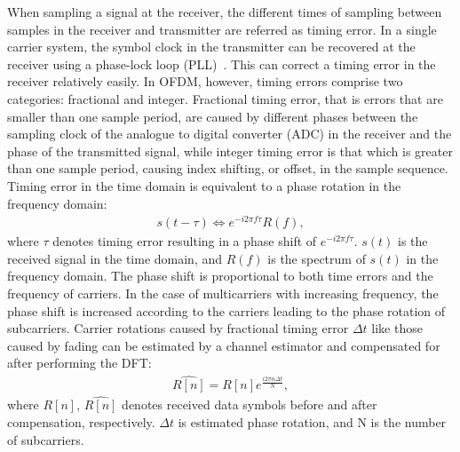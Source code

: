 When sampling a signal at the receiver, the different times of sampling between samples in the receiver and transmitter are referred as timing error.
In a single carrier system, the symbol clock in the transmitter can be recovered at the receiver using a phase-lock loop (PLL)~\cite{farhang2008signal}.
This can correct a timing error in the receiver relatively easily.
In OFDM, however, timing errors comprise two categories: fractional and integer.
Fractional timing error, that is errors that are smaller than one sample period, are caused by different phases between the sampling clock of the analogue to digital converter (ADC) in the receiver and the phase of the transmitted signal, while integer timing error is that which is greater than one sample period, causing index shifting, or offset, in the sample sequence.
Timing error in the time domain is equivalent to a phase rotation in the frequency domain:
\begin{eqnarray}
\label{equ:timingoffset}
               s (t - \tau )   \Leftrightarrow  e^{-i2\pi f\tau} R(f),
\end{eqnarray}
where $\tau$ denotes timing error resulting in a phase shift of $e^{-i2\pi f\tau}$.
$s(t)$ is the received signal in the time domain, and $R(f)$ is the spectrum of $s(t)$ in the frequency domain.
The phase shift is proportional to both time errors and the frequency of carriers.
In the case of multicarriers with increasing frequency, the phase shift is increased according to the carriers leading to the phase rotation of subcarriers.
Carrier rotations caused by fractional timing error $\Delta t$ like those caused by fading can be estimated by a channel estimator and compensated for after performing the DFT:
\begin{eqnarray}
\label{equ:rotationcompensation}
               \widehat{R[n]} = R[n] e^{\frac{i2\pi n \Delta  t}{N}},
\end{eqnarray}
where $R[n]$, $\widehat{R[n]}$ denotes received data symbols before and after compensation, respectively. $\Delta t$ is estimated phase rotation, and N is the number of subcarriers.

